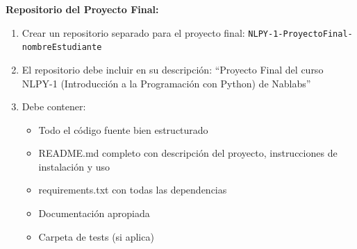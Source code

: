 \documentclass[12pt,letterpaper]{article}
\begin{document}
\textbf{Repositorio del Proyecto Final:}
\begin{enumerate}[leftmargin=*]
    \item Crear un repositorio separado para el proyecto final: \texttt{NLPY-1-ProyectoFinal-nombreEstudiante}
    
    \item El repositorio debe incluir en su descripción: ``Proyecto Final del curso NLPY-1 (Introducción a la Programación con Python) de Nablabs''
    
    \item Debe contener:
    \begin{itemize}
        \item Todo el código fuente bien estructurado
        \item README.md completo con descripción del proyecto, instrucciones de instalación y uso
        \item requirements.txt con todas las dependencias
        \item Documentación apropiada
        \item Carpeta de tests (si aplica)
    \end{itemize}
\end{enumerate}
\end{document}

